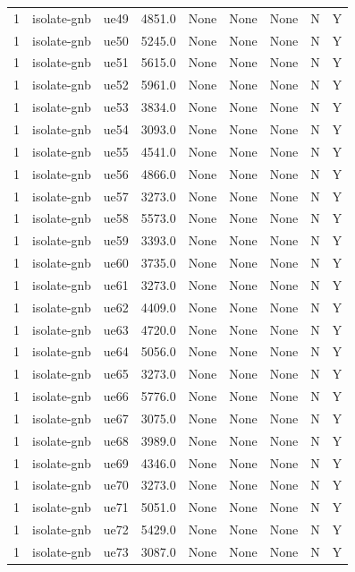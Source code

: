 \begin{table}[ht]
\begin{tabular}{|c|c|c|c|c|c|c|c|c|}
1 & isolate-gnb & ue49 & 4851.0 & None & None & None & N & Y \\
1 & isolate-gnb & ue50 & 5245.0 & None & None & None & N & Y \\
1 & isolate-gnb & ue51 & 5615.0 & None & None & None & N & Y \\
1 & isolate-gnb & ue52 & 5961.0 & None & None & None & N & Y \\
1 & isolate-gnb & ue53 & 3834.0 & None & None & None & N & Y \\
1 & isolate-gnb & ue54 & 3093.0 & None & None & None & N & Y \\
1 & isolate-gnb & ue55 & 4541.0 & None & None & None & N & Y \\
1 & isolate-gnb & ue56 & 4866.0 & None & None & None & N & Y \\
1 & isolate-gnb & ue57 & 3273.0 & None & None & None & N & Y \\
1 & isolate-gnb & ue58 & 5573.0 & None & None & None & N & Y \\
1 & isolate-gnb & ue59 & 3393.0 & None & None & None & N & Y \\
1 & isolate-gnb & ue60 & 3735.0 & None & None & None & N & Y \\
1 & isolate-gnb & ue61 & 3273.0 & None & None & None & N & Y \\
1 & isolate-gnb & ue62 & 4409.0 & None & None & None & N & Y \\
1 & isolate-gnb & ue63 & 4720.0 & None & None & None & N & Y \\
1 & isolate-gnb & ue64 & 5056.0 & None & None & None & N & Y \\
1 & isolate-gnb & ue65 & 3273.0 & None & None & None & N & Y \\
1 & isolate-gnb & ue66 & 5776.0 & None & None & None & N & Y \\
1 & isolate-gnb & ue67 & 3075.0 & None & None & None & N & Y \\
1 & isolate-gnb & ue68 & 3989.0 & None & None & None & N & Y \\
1 & isolate-gnb & ue69 & 4346.0 & None & None & None & N & Y \\
1 & isolate-gnb & ue70 & 3273.0 & None & None & None & N & Y \\
1 & isolate-gnb & ue71 & 5051.0 & None & None & None & N & Y \\
1 & isolate-gnb & ue72 & 5429.0 & None & None & None & N & Y \\
1 & isolate-gnb & ue73 & 3087.0 & None & None & None & N & Y \\

\end{tabular}
\end{table}
